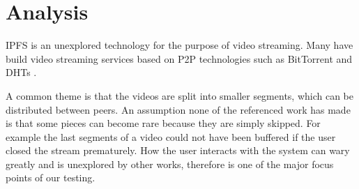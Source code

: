 \chapter{Analysis}
\label{cha:analysis}

\acs{IPFS} is an unexplored technology for the purpose of video streaming. Many have build video streaming services based on \acs{P2P} technologies such as BitTorrent and \acs{DHT}s \cite{gazdar2017toward}.

A common theme is that the videos are split into smaller segments, which can be distributed between peers. An assumption none of the referenced work has made is that some pieces can become rare because they are simply skipped. For example the last segments of a video could not have been buffered if the user closed the stream prematurely. How the user interacts with the system can wary greatly and is unexplored by other works, therefore is one of the major focus points of our testing.


